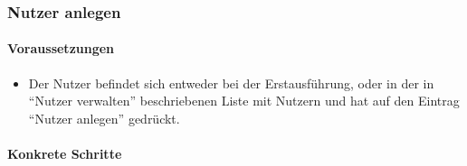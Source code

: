 \subsubsection{Nutzer anlegen}
\paragraph{Voraussetzungen}
\begin{itemize}
\item Der Nutzer befindet sich entweder bei der Erstausführung, oder 
in der in "`Nutzer verwalten"' beschriebenen Liste mit Nutzern und hat auf 
den Eintrag "`Nutzer anlegen"' gedrückt.
\end{itemize}

\paragraph{Konkrete Schritte}
